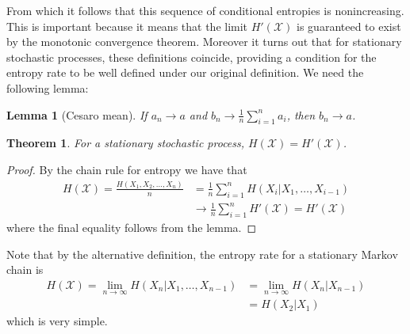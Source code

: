 \documentclass{article}
\theoremstyle{definition}
\theoremstyle{plain}
\newtheorem{lemma}{Lemma}[section]
\newtheorem{theorem}{Theorem}[section]
\begin{document}
From which it follows that this sequence of conditional entropies is nonincreasing. This is important because it means that the limit $H'(\mathcal{X})$ is guaranteed to exist by the monotonic convergence theorem. Moreover it turns out that for stationary stochastic processes, these definitions coincide, providing a condition for the entropy rate to be well defined under our original definition. We need the following lemma:
\begin{lemma}[Cesaro mean]
	If $a_n \to a$ and $b_n \to \frac{1}{n}\sum_{i=1}^n a_i$, then $b_n \to a$. 
\end{lemma}
\begin{theorem}
	For a stationary stochastic process, $H(\mathcal{X}) = H'(\mathcal{X})$. 
\end{theorem}
\begin{proof}
	By the chain rule for entropy we have that 
	\begin{align}
		H(\mathcal{X}) = \frac{H(X_1,X_2,\ldots,X_n)}{n} &= \frac{1}{n}\sum_{i=1}^n H(X_i|X_1,\ldots,X_{i-1}) \\
		&\to \frac{1}{n}\sum_{i=1}^n H'(\mathcal{X}) = H'(\mathcal{X})
	\end{align}
where the final equality follows from the lemma. 
\end{proof}
Note that by the alternative definition, the entropy rate for a stationary Markov chain is 
\begin{align}
	H(\mathcal{X}) = \lim_{n \to \infty} H(X_n|X_1,\ldots,X_{n-1}) &= \lim_{n \to \infty} H(X_n|X_{n-1}) \\ &= H(X_2|X_1)
\end{align}
which is very simple. 
\end{document}
